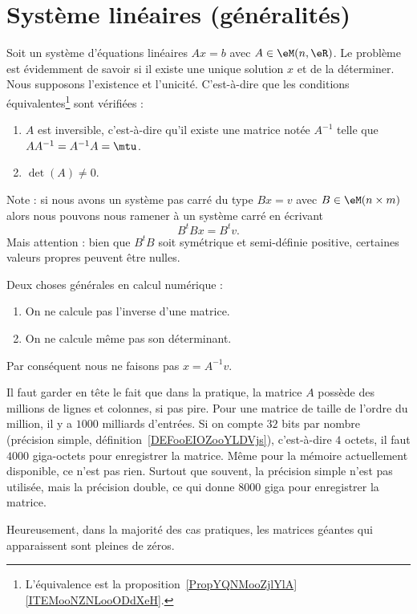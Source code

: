 \section{Système linéaires (généralités)}

Soit un système d'équations linéaires \( Ax=b\) avec \( A\in \eM(n,\eR)\). Le problème est évidemment de savoir si il existe une unique solution \( x\) et de la déterminer. Nous supposons l'existence et l'unicité. C'est-à-dire que les conditions équivalentes\footnote{L'équivalence est la proposition~\ref{PropYQNMooZjlYlA}\ref{ITEMooNZNLooODdXeH}.} sont vérifiées :
\begin{enumerate}
	\item
	      \( A\) est inversible, c'est-à-dire qu'il existe une matrice notée \( A^{-1}\) telle que \( AA^{-1}=A^{-1}A=\mtu\).
	\item
	      \( \det(A)\neq 0\).
\end{enumerate}
Note : si  nous avons un système pas carré du type \( Bx=v\) avec \( B\in \eM(n\times m)\) alors nous pouvons nous ramener à un système carré en écrivant
\begin{equation}
	B^tBx=B^tv.
\end{equation}
Mais attention : bien que \( B^tB\) soit symétrique et semi-définie positive, certaines valeurs propres peuvent être nulles.

\begin{normaltext}
	Deux choses générales en calcul numérique :
	\begin{enumerate}
		\item
		      On ne calcule pas l'inverse d'une matrice.
		\item
		      On ne calcule même pas son déterminant.
	\end{enumerate}
	Par conséquent nous ne faisons pas \( x=A^{-1}v\).

	Il faut garder en tête le fait que dans la pratique, la matrice \( A\) possède des millions de lignes et colonnes, si pas pire. Pour une matrice de taille de l'ordre du million, il y a \( 1000\) milliards d'entrées. Si on compte \( 32\) bits par nombre (précision simple, définition~\ref{DEFooEIOZooYLDVjs}), c'est-à-dire \( 4\) octets, il faut \( 4000\) giga-octets pour enregistrer la matrice. Même pour la mémoire actuellement disponible, ce n'est pas rien. Surtout que souvent, la précision simple n'est pas utilisée, mais la précision double, ce qui donne \( 8000\) giga pour enregistrer la matrice.

	Heureusement, dans la majorité des cas pratiques, les matrices géantes qui apparaissent sont pleines de zéros.

\end{normaltext}

